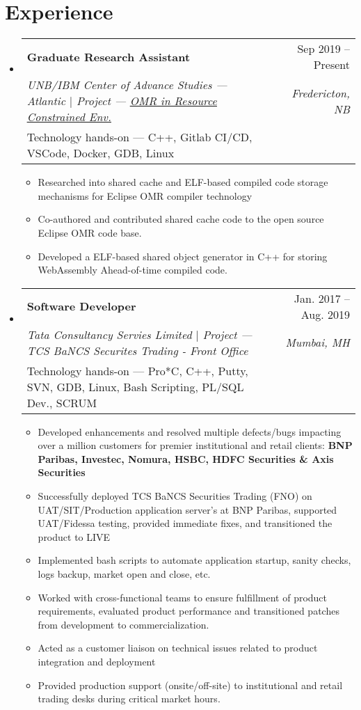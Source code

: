 \documentclass[letterpaper,10pt]{article}
\makeatletter
\newcommand{\resumeItem}[1]{
  \item\small{
    {#1 \vspace{-2pt}}
  }
}
\newcommand{\resumeSubProjheading}[5]{
  \vspace{-2pt}\item
    \begin{tabular*}{0.97\textwidth}[t]{l@{\extracolsep{\fill}}r}
      \textbf{#1} & #2 \\
      \textit{\small#3} & \textit{\small #4} \\
      {\small#5} \\
    \end{tabular*}\vspace{-7pt}
}
\newcommand{\resumeSubSubheading}[2]{
    \item
    \begin{tabular*}{0.97\textwidth}{l@{\extracolsep{\fill}}r}
      \textit{\small#1} & \textit{\small #2} \\
    \end{tabular*}\vspace{-7pt}
}
\newcommand{\resumeSubHeadingListStart}{\begin{itemize}[leftmargin=0.15in, label={}]}
\newcommand{\resumeSubHeadingListEnd}{\end{itemize}}
\newcommand{\resumeItemListStart}{\begin{itemize}}
\newcommand{\resumeItemListEnd}{\end{itemize}\vspace{-5pt}}
\makeatother
\begin{document}
\section{Experience}
  \resumeSubHeadingListStart

    \resumeSubProjheading
      {Graduate Research Assistant }{Sep 2019 -- Present}
      {UNB/IBM Center of Advance Studies --- Atlantic $|$ Project --- \href{https://www-01.ibm.com/ibm/cas/canada/projects?projectId=1036}{\underline{OMR in Resource Constrained Env.}} }{Fredericton, NB}
      {Technology hands-on --- C++, Gitlab CI/CD, VSCode, Docker, GDB, Linux}
      \resumeItemListStart
        \resumeItem{Researched into shared cache and ELF-based compiled code storage mechanisms for Eclipse OMR compiler technology}
        \resumeItem{Co-authored and contributed shared cache code to the open source Eclipse OMR code base.}
        \resumeItem{Developed a ELF-based shared object generator in C++ for storing WebAssembly Ahead-of-time compiled code.}
      \resumeItemListEnd
      

    \resumeSubProjheading
      {Software Developer}{Jan. 2017 -- Aug. 2019}
      {Tata Consultancy Servies Limited $|$ Project --- TCS BaNCS Securites Trading - Front Office }{Mumbai, MH} 
      {Technology hands-on --- Pro*C, C++, Putty, SVN, GDB, Linux, Bash Scripting, PL/SQL Dev., SCRUM}
      \resumeItemListStart
      \resumeItem{Developed enhancements and resolved multiple defects/bugs impacting over a million customers for premier institutional and retail clients: \textbf{BNP Paribas, Investec, Nomura, HSBC, HDFC Securities \& Axis Securities}}
      \resumeItem{Successfully deployed TCS BaNCS Securities Trading (FNO) on UAT/SIT/Production application server's at BNP Paribas, supported UAT/Fidessa testing, provided immediate fixes, and transitioned the product to LIVE}       
      \resumeItem{Implemented bash scripts to automate application startup, sanity checks, logs backup, market open and close, etc.}
      \resumeItem{Worked with cross-functional teams to ensure fulfillment of product requirements, evaluated product performance and transitioned patches from development to commercialization.}  
      \resumeItem{Acted as a customer liaison on technical issues related to product integration and deployment}
      \resumeItem{Provided production support (onsite/off-site) to institutional and retail trading desks during critical market hours.}
      \resumeItemListEnd
  \resumeSubHeadingListEnd
\end{document}
